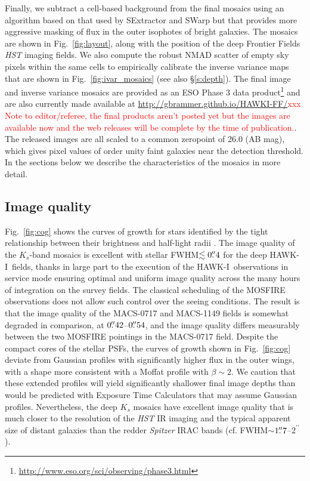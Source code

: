 \documentclass[preprint2]{aastex6}
\newcommand\XXX[1]{{\textcolor{red}{xxx #1}}}
\gdef\HAWKI{\mbox{HAWK-I}}
\begin{document}
Finally, we subtract a cell-based background from the final mosaics using an algorithm based on that used by SExtractor and SWarp but that provides more aggressive masking of flux in the outer isophotes of bright galaxies. The mosaics are shown in Fig.~\ref{fig:layout}, along with the position of the deep Frontier Fields \textit{HST} imaging fields.  We also compute the robust NMAD scatter \citep{brammer:08} of empty sky pixels within the same cells to empirically calibrate the inverse variance maps that are shown in Fig.~\ref{fig:ivar_mosaics} (see also \S\ref{s:depth}).  The final image and inverse variance mosaics are provided as an ESO Phase 3 data product\footnote{\url{http://www.eso.org/sci/observing/phase3.html}} and are also currently made available at \url{http://gbrammer.github.io/HAWKI-FF/}\XXX{Note to editor/referee, the final products aren't posted yet but the images are available now and the web releases will be complete by the time of publication.}.  The released images are all scaled to a common zeropoint of 26.0 (AB mag), which gives pixel values of order unity faint galaxies near the detection threshold.  In the sections below we describe the characteristics of the mosaics in more detail.  


\subsection{Image quality}
\label{s:fwhm}

Fig.~\ref{fig:cog} shows the curves of growth for stars identified by the tight relationship between their brightness and half-light radii \citep[see, e.g., Fig.~13 of][]{skelton:14}.  The image quality of the $K_s$-band mosaics is excellent with stellar FWHM$\lesssim0\mbox{$.\!\!^{\prime\prime}$}4$ for the deep \HAWKI\ fields, thanks in large part to the execution of the \HAWKI\ observations in service mode ensuring optimal and uniform image quality across the many hours of integration on the survey fields.  The classical scheduling of the MOSFIRE observations does not allow such control over the seeing conditions.  The result is that the image quality of the MACS-0717 and MACS-1149 fields is somewhat degraded in comparison, at $0\mbox{$.\!\!^{\prime\prime}$}42$--$0\mbox{$.\!\!^{\prime\prime}$}54$, and the image quality differs measurably between the two MOSFIRE pointings in the MACS-0717 field.  Despite the compact cores of the stellar PSFs, the curves of growth shown in Fig.~\ref{fig:cog} deviate from Gaussian profiles with significantly higher flux in the outer wings, with a shape more consistent with a Moffat profile \citep{trujillo:01}  with $\beta\sim2$.  We caution that these extended profiles will yield significantly shallower final image depths than would be predicted with Exposure Time Calculators that may assume Gaussian profiles.  Nevertheless, the deep $K_s$ mosaics have excellent image quality that is much closer to the resolution of the \textit{HST} IR imaging and the typical apparent size of distant galaxies \citep[median $r_e\sim0\farcs1$--$0\farcs2$ at $z>4$;][]{shibuya:15} than the redder \textit{Spitzer} IRAC bands (cf. FWHM$\sim$$1\mbox{$.\!\!^{\prime\prime}$}7$--$2^{\prime\prime}$).
\end{document}
